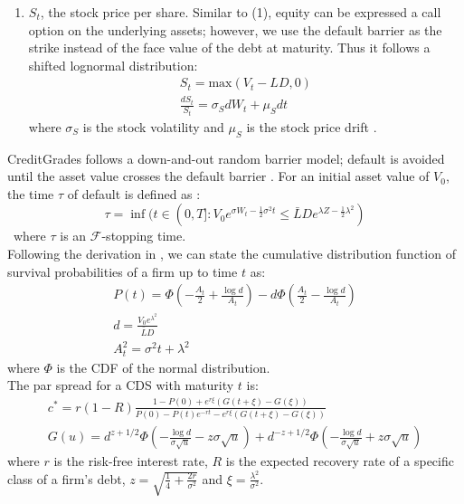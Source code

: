 \documentclass[11t,a4paper]{article}
\begin{document}
\begin{enumerate}
\item $S_t$, the stock price per share. Similar to (1), equity can be expressed a call option on the underlying assets; however, we use the default barrier as the strike instead of the face value of the debt at maturity. Thus it follows a shifted lognormal distribution:
\begin{gather}
    S_t = \text{max}(V_t - LD, 0) \\
     \frac{dS_t}{S_t} = \sigma_S dW_t + \mu_Sdt
\end{gather}
where $\sigma_S$ is the stock volatility and $\mu_S$ is the stock price drift \cite{sfin}. 
\end{enumerate}
CreditGrades follows a down-and-out random barrier model; default is avoided until the asset value crosses the default barrier \cite{sfin}.
For an initial asset value of $V_0$, the time $\tau$ of default is defined as \cite{levycg}:
\[\tau = \inf(t\in(0,T] : V_0e^{\sigma W_t-\frac{1}{2}\sigma^2t} \leq \bar{L}De^{\lambda Z - \frac{1}{2}\lambda^2})\]\
where $\tau$ is an $\mathcal{F}$-stopping time. \\  
Following the derivation in \cite{cgtechdoc}, we can state the cumulative distribution function of survival probabilities of a firm up to time $t$ as:
\begin{gather}
P(t) = \Phi(-\frac{A_t}{2} + \frac{\log{d}}{A_t}) - d \Phi(\frac{A_t}{2} - \frac{\log{d}}{A_t})\\
d = \frac{V_0e^{\lambda^2}}{\bar{L}D} \\
A^2_t = \sigma^2t + \lambda^2
\end{gather}
where $\Phi$ is the CDF of the normal distribution. \\
The par spread for a CDS with maturity $t$ is:
\begin{gather}
c^* = r(1-R)\frac{1-P(0)+e^{r\xi}(G(t+\xi) - G(\xi))}{P(0)-P(t)e^{-rt}-e^{r\xi}(G(t+\xi) - G(\xi))} \\
G(u) = d^{z+1/2}\Phi(-\frac{\log{d}}{\sigma\sqrt{u}} - z\sigma\sqrt{u}) + d^{-z+1/2}\Phi(-\frac{\log{d}}{\sigma\sqrt{u}} + z\sigma\sqrt{u}) 
\end{gather} 
 where $r$ is the risk-free interest rate, $R$ is the expected recovery rate of a specific class of a firm's debt, $z = \sqrt{\frac{1}{4} + \frac{2r}{\sigma^2}}$ and $\xi = \frac{\lambda^2}{\sigma^2}$.
\end{document}
